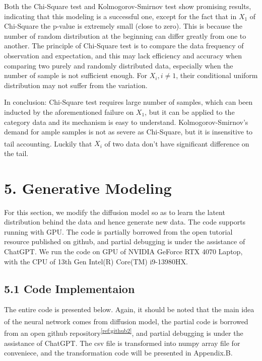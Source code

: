 \documentclass[11pt]{article}
\begin{document}
    Both the Chi-Square test and Kolmogorov-Smirnov test show promising
results, indicating that this modeling is a successful one, except for
the fact that in \(X_1\) of Chi-Square the p-value is extremely small
(close to zero). This is because the number of random distribution at
the beginning can differ greatly from one to another. The principle of
Chi-Square test is to compare the data frequency of observation and
expectation, and this may lack efficiency and accuracy when comparing
two purely and randomly distributed data, especially when the number of
sample is not sufficient enough. For \(X_i,i \neq 1\), their conditional
uniform distribution may not suffer from the variation.

In conclusion: Chi-Square test requires large number of samples, which
can been inducted by the aforementioned failure on \(X_1\), but it can
be applied to the category data and its mechanism is easy to understand.
Kolmogorov-Smirnov's demand for ample samples is not as severe as
Chi-Square, but it is insensitive to tail accounting\textsuperscript{\cite{kolmogorov}}. Luckily
that \(X_i\) of two data don't have significant difference on the tail.

    \section*{5. Generative Modeling}\label{generative-modeling}

For this section, we modify the diffusion model so as to learn the
latent distribution behind the data and hence generate new data. The
code supports running with GPU. The code is partially borrowed from the
open tutorial resource published on github, and partial debugging is
under the assistance of ChatGPT. We run the code on GPU of NVIDIA
GeForce RTX 4070 Laptop, with the CPU of 13th Gen Intel(R) Core(TM)
i9-13980HX.

    \subsection*{5.1 Code Implementaion}\label{code-implementaion}

The entire code is presented below. Again, it should be noted that the
main idea of the neural network comes from diffusion model\textsuperscript{\cite{diffusion}}, the
partial code is borrowed from an open github repository\textsuperscript{\ref{ref:github2}}, and
partial debugging is under the assistance of ChatGPT. The csv file is
transformed into numpy array file for conveniece, and the transformation
code will be presented in Appendix.B.
\end{document}
